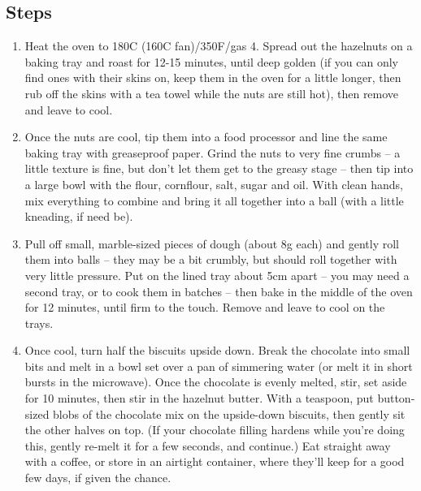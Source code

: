\documentclass{book}
\begin{document}
\subsection*{Steps}
\begin{enumerate}
\item Heat the oven to 180C (160C fan)/350F/gas 4. Spread out the hazelnuts on a baking tray and roast for 12-15 minutes, until deep golden (if you can only find ones with their skins on, keep them in the oven for a little longer, then rub off the skins with a tea towel while the nuts are still hot), then remove and leave to cool.
\item Once the nuts are cool, tip them into a food processor and line the same baking tray with greaseproof paper. Grind the nuts to very fine crumbs – a little texture is fine, but don’t let them get to the greasy stage – then tip into a large bowl with the flour, cornflour, salt, sugar and oil. With clean hands, mix everything to combine and bring it all together into a ball (with a little kneading, if need be).
\item Pull off small, marble-sized pieces of dough (about 8g each) and gently roll them into balls – they may be a bit crumbly, but should roll together with very little pressure. Put on the lined tray about 5cm apart – you may need a second tray, or to cook them in batches – then bake in the middle of the oven for 12 minutes, until firm to the touch. Remove and leave to cool on the trays.
\item Once cool, turn half the biscuits upside down. Break the chocolate into small bits and melt in a bowl set over a pan of simmering water (or melt it in short bursts in the microwave). Once the chocolate is evenly melted, stir, set aside for 10 minutes, then stir in the hazelnut butter. With a teaspoon, put button-sized blobs of the chocolate mix on the upside-down biscuits, then gently sit the other halves on top. (If your chocolate filling hardens while you’re doing this, gently re-melt it for a few seconds, and continue.) Eat straight away with a coffee, or store in an airtight container, where they’ll keep for a good few days, if given the chance.
\end{enumerate}
\newpage
\end{document}
